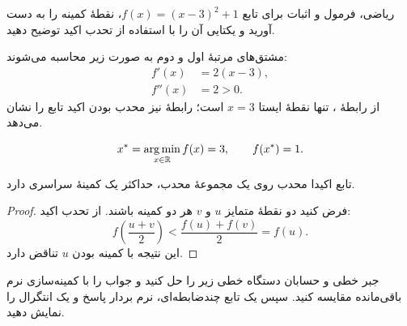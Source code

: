 \documentclass[\AssignmentBaseSize,a4paper]{article}
\begin{document}
\MakeAssignmentTitle
\begin{problem}[۲۰ نمره]{ریاضی، فرمول و اثبات}\label{prob:math}
  برای تابع $f(x)=(x-3)^2+1$، نقطهٔ کمینه را به دست آورید
  و یکتایی آن را با استفاده از تحدب اکید توضیح دهید.
\end{problem}
\begin{solution}
  مشتق‌های مرتبهٔ اول و دوم به صورت زیر محاسبه می‌شوند:
  \begin{align}
    f'(x)&=2(x-3),\label{eq:derivative}\\
    f''(x)&=2>0.\label{eq:convexity}
  \end{align}
  از رابطهٔ ، تنها نقطهٔ ایستا $x=3$ است؛
  رابطهٔ  نیز محدب بودن اکید تابع را نشان می‌دهد.
  \begin{answerbox}
    \vspace{-3mm}
    \[
      x^*=\operatorname*{arg\,min}_{x\in\mathbb{R}} f(x)=3,\qquad f(x^*)=1.
    \]
    \vspace{-3mm}
  \end{answerbox}

  \begin{theorem}\label{thm:unique}
    تابع اکیدا محدب روی یک مجموعهٔ محدب، حداکثر یک کمینهٔ سراسری دارد.
  \end{theorem}
  \begin{proof}
    فرض کنید دو نقطهٔ متمایز $u$ و $v$ هر دو کمینه باشند. از تحدب اکید:
    \[
      f\!\left(\frac{u+v}{2}\right)
      <\frac{f(u)+f(v)}{2}=f(u).
    \]
    این نتیجه با کمینه بودن $u$ تناقض دارد.
  \end{proof}
\end{solution}
\newpage
\begin{problem}[۲۰ نمره]{جبر خطی و حسابان}\label{prob:algebra}
  دستگاه خطی زیر را حل کنید و جواب را با کمینه‌سازی نرم باقی‌مانده مقایسه کنید.
  سپس یک تابع چندضابطه‌ای، نرم بردار پاسخ و یک انتگرال را نمایش دهید.
\end{problem}
\end{document}
